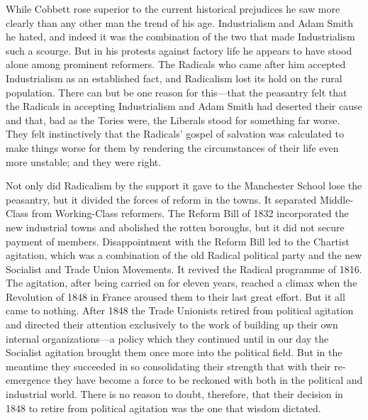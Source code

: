 \documentclass{book}
\begin{document}
While Cobbett rose superior to the current historical prejudices he saw more clearly than any other man the trend of his age. Industrialism and Adam Smith he hated, and indeed it was the combination of the two that made Industrialism such a scourge. But in his protests against factory life he appears to have stood alone among prominent reformers. The Radicals who came after him accepted Industrialism as an established fact, and Radicalism lost its hold on the rural population. There can but be one reason for this—that the peasantry felt that the Radicals in accepting Industrialism and Adam Smith had deserted their cause and that, bad as the Tories were, the Liberals stood for something far worse. They felt instinctively that the Radicals’ gospel of salvation was calculated to make things worse for them by rendering the circumstances of their life even more unstable; and they were right.

Not only did Radicalism by the support it gave to the Manchester School lose the peasantry, but it divided the forces of reform in the towns. It separated Middle-Class from Working-Class reformers. The Reform Bill of 1832 incorporated the new industrial towns and abolished the rotten boroughs, but it did not secure payment of members. Disappointment with the Reform Bill led to the Chartist agitation, which was a combination of the old Radical political party and the new Socialist and Trade Union Movements. It revived the Radical programme of 1816. The agitation, after being carried on for eleven years, reached a climax when the Revolution of 1848 in France aroused them to their last great effort. But it all came to nothing. After 1848 the Trade Unionists retired from political agitation and directed their attention exclusively to the work of building up their own internal organizations—a policy which they continued until in our day the Socialist agitation brought them once more into the political field. But in the meantime they succeeded in so consolidating their strength that with their re-emergence they have become a force to be reckoned with both in the political and industrial world. There is no reason to doubt, therefore, that their decision in 1848 to retire from political agitation was the one that wisdom dictated.
\end{document}
